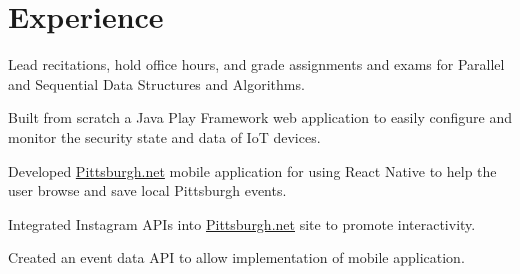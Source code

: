 \documentclass[]{openfont}
\begin{document}
\begin{minipage}[t]{0.59\textwidth} 


\section{Experience}

\vspace{\topsep} %
\begin{tightemize}
    \item Lead recitations, hold office hours, and grade assignments and exams
        for Parallel and Sequential Data Structures and Algorithms.
\end{tightemize}

\vspace{\topsep} %
\begin{tightemize}
    \item Built from scratch a Java Play Framework web application to easily configure and monitor the security state and data of IoT devices.
\end{tightemize}

\vspace{\topsep} %
\begin{tightemize}
    \item Developed \href{http://www.pittsburgh.net/}{Pittsburgh.net} mobile application for using React Native to help the user browse and save local Pittsburgh events.
\end{tightemize}
\vspace{3 pt}
\begin{tightemize}
    \item Integrated Instagram APIs into \href{http://www.pittsburgh.net/}{Pittsburgh.net} site to promote interactivity.
    \item Created an event data API to allow implementation of mobile application.
\end{tightemize}


\end{minipage}
\end{document}
